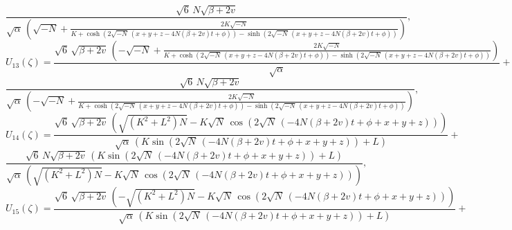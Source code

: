 \documentclass[10pt]{NSP1}
\numberwithin{equation}{section}
\begin{document}
\begin{equation}\frac{\sqrt{6}\, N \sqrt{\beta +2 v}}{\sqrt{\alpha}\, \left(\sqrt{-N}+\frac{2 K \sqrt{-N}}{K +\cosh \left(2 \sqrt{-N}\, \left(x +y +z -4 N \left(\beta +2 v \right) t +\phi \right)\right)-\sinh \left(2 \sqrt{-N}\, \left(x +y +z -4 N \left(\beta +2 v \right) t +\phi \right)\right)}\right)},
\end{equation}
\begin{equation}\label{U13}
    U_{13}\! \left(\zeta \right) =
\frac{\sqrt{6}\, \sqrt{\beta +2 v}\, \left(-\sqrt{-N}+\frac{2 K \sqrt{-N}}{K +\cosh \left(2 \sqrt{-N}\, \left(x +y +z -4 N \left(\beta +2 v \right) t +\phi \right)\right)-\sinh \left(2 \sqrt{-N}\, \left(x +y +z -4 N \left(\beta +2 v \right) t +\phi \right)\right)}\right)}{\sqrt{\alpha}}+\nonumber
\end{equation}
\begin{equation}
\frac{\sqrt{6}\, N \sqrt{\beta +2 v}}{\sqrt{\alpha}\, \left(-\sqrt{-N}+\frac{2 K \sqrt{-N}}{K +\cosh \left(2 \sqrt{-N}\, \left(x +y +z -4 N \left(\beta +2 v \right) t +\phi \right)\right)-\sinh \left(2 \sqrt{-N}\, \left(x +y +z -4 N \left(\beta +2 v \right) t +\phi \right)\right)}\right)},
\end{equation}
\begin{equation}\label{U14}
    U_{14}\! \left(\zeta \right) =
\frac{\sqrt{6}\, \sqrt{\beta +2 v}\, \left(\sqrt{\left(K^{2}+L^{2}\right) N}-K \sqrt{N}\, \cos \! \left(2 \sqrt{N}\, \left(-4 N \left(\beta +2 v \right) t +\phi +x +y +z \right)\right)\right)}{\sqrt{\alpha}\, \left(K \sin \! \left(2 \sqrt{N}\, \left(-4 N \left(\beta +2 v \right) t +\phi +x +y +z \right)\right)+L \right)}+\nonumber
\end{equation}
\begin{equation}
\frac{\sqrt{6}\, N \sqrt{\beta +2 v}\, \left(K \sin \! \left(2 \sqrt{N}\, \left(-4 N \left(\beta +2 v \right) t +\phi +x +y +z \right)\right)+L \right)}{\sqrt{\alpha}\, \left(\sqrt{\left(K^{2}+L^{2}\right) N}-K \sqrt{N}\, \cos \! \left(2 \sqrt{N}\, \left(-4 N \left(\beta +2 v \right) t +\phi +x +y +z \right)\right)\right)},
\end{equation}
\begin{equation}\label{U15}
    U_{15}\! \left(\zeta \right) =
\frac{\sqrt{6}\, \sqrt{\beta +2 v}\, \left(-\sqrt{\left(K^{2}+L^{2}\right) N}-K \sqrt{N}\, \cos \! \left(2 \sqrt{N}\, \left(-4 N \left(\beta +2 v \right) t +\phi +x +y +z \right)\right)\right)}{\sqrt{\alpha}\, \left(K \sin \! \left(2 \sqrt{N}\, \left(-4 N \left(\beta +2 v \right) t +\phi +x +y +z \right)\right)+L \right)}+\nonumber
\end{equation}
\end{document}
